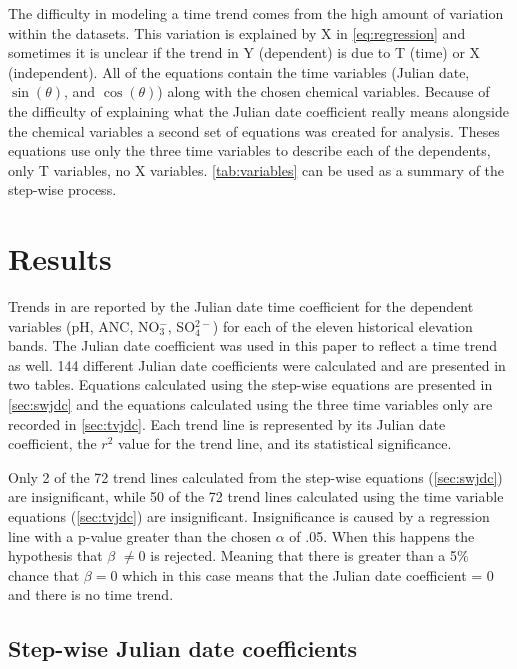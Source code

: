 

The difficulty in modeling a time trend comes from the high amount of variation within the datasets.  
This variation is explained by X in \autoref{eq:regression} and sometimes it is unclear if the trend in Y (dependent) is due to T (time) or X (independent).
All of the equations contain the time variables (Julian date, $\sin(\theta)$, and $\cos(\theta)$) along with the chosen chemical variables.  
Because of the difficulty of explaining what the Julian date coefficient really means alongside the chemical variables a second set of equations was created for analysis.
Theses equations use only the three time variables to describe each of the dependents, only T variables, no X variables.
\autoref{tab:variables} can be used as a summary of the step-wise process.



\section{Results}
Trends in \citet{robinson2008ph} are reported by the Julian date time coefficient for the dependent variables (pH, ANC, NO$_3^-$, SO$_4^{2-}$)  for each of the eleven historical elevation bands.
The Julian date coefficient was used in this paper to reflect a time trend as well.
144 different Julian date coefficients were calculated and are presented in two tables.  
Equations calculated using the step-wise equations are presented in \autoref{sec:swjdc} and the equations calculated using the three time variables only are recorded in  \autoref{sec:tvjdc}.
Each trend line is represented by its Julian date coefficient, the $r^2$ value for the trend line, and its statistical significance.

Only 2 of the 72 trend lines calculated from the step-wise equations (\autoref{sec:swjdc}) are insignificant, while 50 of the 72 trend lines calculated using the time variable equations (\autoref{sec:tvjdc}) are insignificant.  
Insignificance is caused by a regression line with a p-value greater than the chosen $\alpha$ of .05.
When this happens the hypothesis that $\beta$ $\neq 0$  is rejected.
Meaning that there is greater than a 5$\%$ chance that $\beta= 0$ which in this case means that the Julian date coefficient = 0 and there is no time trend. 

\subsection{Step-wise Julian date coefficients}\label{sec:swjdc}

